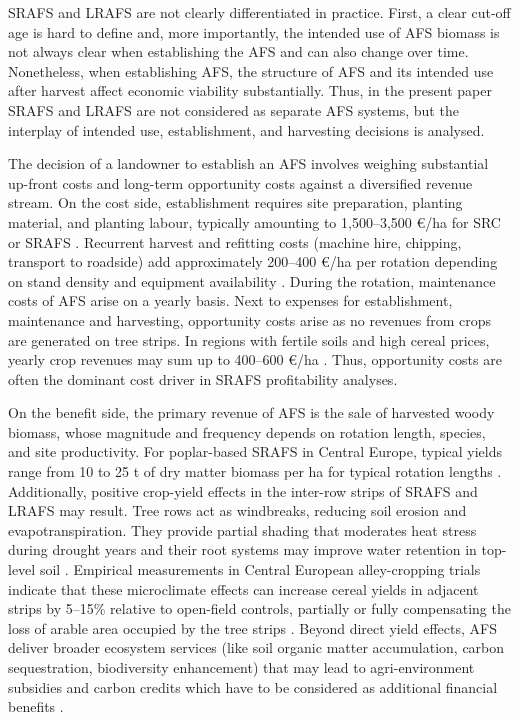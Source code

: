 \documentclass[APA,TimesLARGE]{WileyNJDv5} %
\begin{document}
SRAFS and LRAFS are not clearly differentiated in practice. First, a clear cut-off age is hard to define and, more importantly, the intended use of AFS biomass is not always clear when establishing the AFS and can also change over time. Nonetheless, when establishing AFS, the structure of AFS and its intended use after harvest affect economic viability substantially. Thus, in the present paper SRAFS and LRAFS are not considered as separate AFS systems, but the interplay of intended use, establishment, and harvesting decisions is analysed.

The decision of a landowner to establish an AFS involves weighing substantial up-front costs and long-term opportunity costs against a diversified revenue stream. On the cost side, establishment requires site preparation, planting material, and planting labour, typically
amounting to 1,500--3,500 \euro{}/ha for SRC or SRAFS \cite{Faasch2012_SRC_Economics,Testa2014_Poplar_Economics}. Recurrent harvest and refitting costs (machine hire, chipping, transport to roadside) add approximately 200--400 \euro{}/ha per rotation depending on stand density and equipment availability \cite{Testa2014_Poplar_Economics,Spinelli2009_SRC_Harvesting}. During the rotation, maintenance costs of AFS arise on a yearly basis. Next to expenses for establishment, maintenance and harvesting, opportunity costs arise as no revenues from crops are generated on tree strips. In regions with fertile soils and high cereal prices, yearly crop revenues may sum up to 400--600 \euro{}/ha \cite{Faasch2012_SRC_Economics,Graves2007_Agroforestry_Economics}. Thus, opportunity costs are often the dominant cost driver in SRAFS profitability analyses.

On the benefit side, the primary revenue of AFS is the sale of harvested woody biomass, whose magnitude and frequency depends on rotation length, species, and site productivity. For poplar-based SRAFS in Central Europe, typical yields range from 10 to 25 t of dry matter biomass per ha for typical rotation lengths \cite{Huber2018_SRAFS_growth,Niemczyk2021_Poplar_Rotation}. Additionally, positive crop-yield effects in the inter-row strips of SRAFS and LRAFS may result. Tree rows act as windbreaks, reducing soil erosion and evapotranspiration. They provide partial shading that moderates heat stress during drought years and their root systems may improve water retention in top-level soil \cite{Graves2007_Agroforestry_Economics,Grunewald2007_Robinia_AFS}. Empirical measurements in Central European alley-cropping trials indicate that these microclimate effects can increase cereal yields in adjacent strips by 5--15\% relative to open-field controls, partially or fully compensating the loss of arable area occupied by the tree strips \cite{Graves2007_Agroforestry_Economics}. Beyond direct yield effects, AFS deliver broader ecosystem services (like soil organic matter accumulation, carbon sequestration, biodiversity enhancement) that may lead to agri-environment subsidies and carbon credits which have to be considered as additional financial benefits \cite{Toensmeier2017_Carbon_Agroforestry,Faasch2012_SRC_Economics}.
\end{document}
